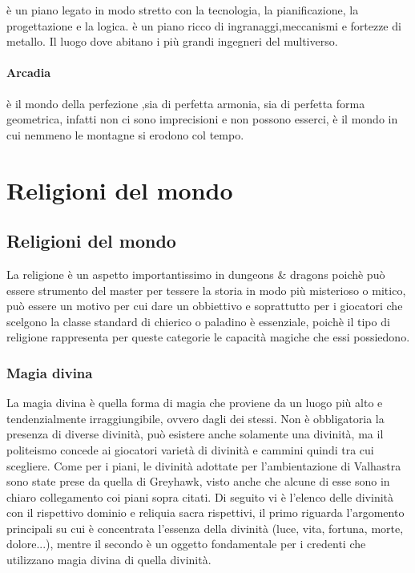 \documentclass[a4paper,12pt]{book}
\begin{document}
è un piano legato in modo stretto con la tecnologia, la pianificazione, la progettazione e la logica.
è un piano ricco di ingranaggi,meccanismi e fortezze di metallo. Il luogo dove abitano i più grandi ingegneri del multiverso.

\subsubsection{Arcadia}

è il mondo della perfezione ,sia di perfetta armonia, sia di perfetta forma geometrica, infatti non ci sono imprecisioni e non possono esserci, è il mondo in cui nemmeno le montagne si erodono col tempo.

\saltariga
\chapter{Religioni del mondo}
\section{Religioni del mondo}

La religione è un aspetto importantissimo in dungeons \& dragons poichè può essere strumento del master per tessere la storia in modo più misterioso o mitico, può essere un motivo per cui dare un obbiettivo e soprattutto per i giocatori che scelgono la classe standard di chierico o paladino è essenziale, poichè il tipo di religione rappresenta per queste categorie le capacità magiche che essi possiedono.

\subsection{Magia divina}

La magia divina è quella forma di magia che proviene da un luogo più alto e tendenzialmente irraggiungibile, ovvero dagli dei stessi.
Non è obbligatoria la presenza di diverse divinità, può esistere anche solamente una divinità, ma il politeismo concede ai giocatori varietà di divinità e cammini quindi tra cui scegliere.
Come per i piani, le divinità adottate per l'ambientazione di Valhastra sono state prese da quella di Greyhawk, visto anche che alcune di esse sono in chiaro collegamento coi piani sopra citati.
Di seguito vi è l'elenco delle divinità con il rispettivo dominio e reliquia sacra rispettivi, il primo riguarda l'argomento principali su cui è concentrata l'essenza della divinità (luce, vita, fortuna, morte, dolore...), mentre il secondo è un oggetto fondamentale per i credenti che utilizzano magia divina di quella divinità.
\end{document}

